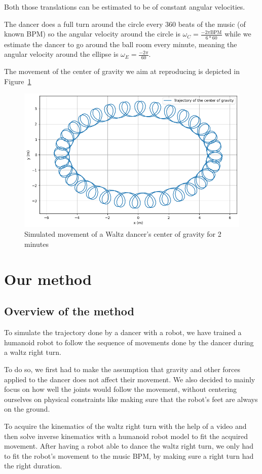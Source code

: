 \documentclass{amsart}
\theoremstyle{definition}
\theoremstyle{plain}
\begin{document}
Both those translations can be estimated to be of constant angular velocities.

The dancer does a full turn around the circle every 360 beats of the music (of known BPM) so the angular velocity around the circle is $\omega_C = \frac{-2\pi \text{BPM}}{6*60}$ while we estimate the dancer to go around the ball room every minute, meaning the angular velocity around the ellipse is $\omega_E = \frac{-2\pi}{60}$. 

The movement of the center of gravity we aim at reproducing is depicted in Figure~\ref{fig:cog_movement}

\begin{figure}
  \centering
  \includegraphics[width = 0.5 \columnwidth]{img/waltz_cog_movement.png} 
  \caption{Simulated movement of a Waltz dancer's center of gravity for 2 minutes}\label{fig:cog_movement}
\end{figure}

\section{Our method}


\subsection{Overview of the method}
To simulate the trajectory done by a dancer with a robot, we have trained a humanoid robot to follow the sequence of movements done by the dancer during a waltz right turn.

To do so, we first had to make the assumption that gravity and other forces applied to the dancer does not affect their movement. We also decided to mainly focus on how well the joints would follow the movement, without centering ourselves on physical constraints like making sure that the robot's feet are always on the ground.

To acquire the kinematics of the waltz right turn with the help of a video and then solve inverse kinematics with a humanoid robot model to fit the acquired movement. 
After having a robot able to dance the waltz right turn, we only had to fit the robot's movement to the music BPM, by making sure a right turn had the right duration.
\end{document}
